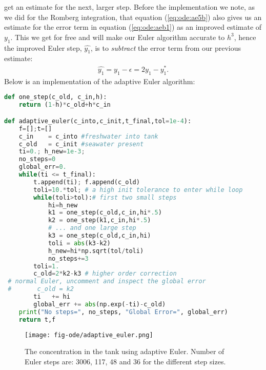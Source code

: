 \documentclass[graybox,sectrefs,envcountresetchap,open=right,final]{svmonodo}
\begin{document}
get an estimate for the next, larger step. Before the implementation we note, as we did for the Romberg integration, that equation (\ref{eq:ode:ae5b}) 
also gives us an estimate for the error term in equation (\ref{eq:ode:aeb1}) as an improved estimate of $y_1$. This we get for
free and will make our Euler algorithm accurate to $h^3$, hence the improved Euler step, $\hat{y_1}$, is to \emph{subtract} the error
term from our previous estimate:
\begin{align}
\hat{y_1}=y_1-\epsilon=2y_1-y_1^*.
\end{align}
Below is an implementation of the adaptive Euler algorithm:































\begin{lstlisting}[language=python,style=blue1]
def one_step(c_old, c_in,h):
    return (1-h)*c_old+h*c_in

def adaptive_euler(c_into,c_init,t_final,tol=1e-4):
    f=[];t=[]
    c_in    = c_into #freshwater into tank
    c_old   = c_init #seawater present 
    ti=0.; h_new=1e-3;
    no_steps=0
    global_err=0.
    while(ti <= t_final):
        t.append(ti); f.append(c_old)
        toli=10.*tol; # a high init tolerance to enter while loop
        while(toli>tol):# first two small steps
            hi=h_new
            k1 = one_step(c_old,c_in,hi*.5)
            k2 = one_step(k1,c_in,hi*.5)
            # ... and one large step
            k3 = one_step(c_old,c_in,hi)
            toli = abs(k3-k2)
            h_new=hi*np.sqrt(tol/toli)
            no_steps+=3
        toli=1.
        c_old=2*k2-k3 # higher order correction
 # normal Euler, uncomment and inspect the global error
 #       c_old = k2 
        ti   += hi
        global_err += abs(np.exp(-ti)-c_old)
    print("No steps=", no_steps, "Global Error=", global_err)
    return t,f

\end{lstlisting}


\begin{figure}[!ht]  %
  \centerline{\texttt{[image: fig-ode/adaptive\_euler.png]}}
  \caption{
  The concentration in the tank using adaptive Euler. Number of Euler steps are: 3006, 117, 48 and 36 for the different step sizes. \label{fig:ode:adapt_euler}
  }
\end{figure}
\end{document}
